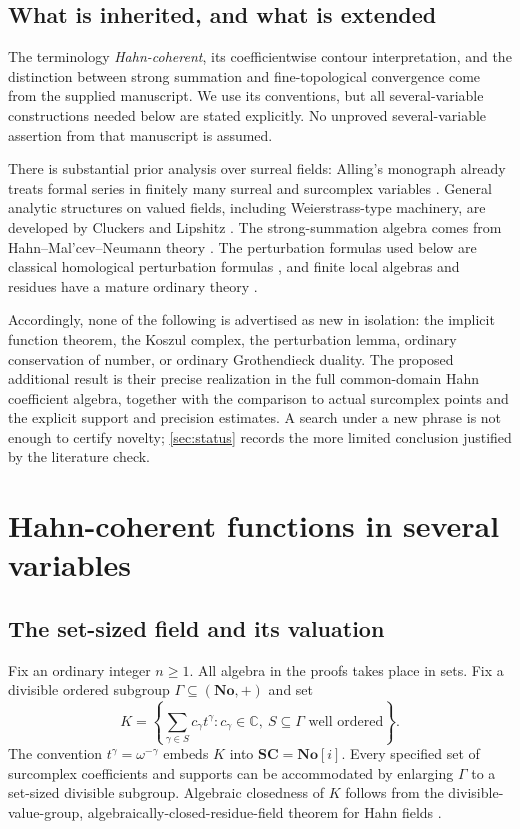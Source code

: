 \documentclass[11pt,letterpaper]{article}
\theoremstyle{definition}
\theoremstyle{remark}
\newcommand{\No}{\mathbf{No}}
\newcommand{\SC}{\mathbf{SC}}
\newcommand{\C}{\mathbb C}
\numberwithin{equation}{section}
\begin{document}
\subsection{What is inherited, and what is extended}
The terminology \emph{Hahn-coherent}, its coefficientwise contour interpretation, and the distinction between strong summation and fine-topological convergence come from the supplied manuscript. We use its conventions, but all several-variable constructions needed below are stated explicitly. No unproved several-variable assertion from that manuscript is assumed.

There is substantial prior analysis over surreal fields: Alling's monograph already treats formal series in finitely many surreal and surcomplex variables \cite{Alling}. General analytic structures on valued fields, including Weierstrass-type machinery, are developed by Cluckers and Lipshitz \cite{CluckersLipshitz}. The strong-summation algebra comes from Hahn--Mal'cev--Neumann theory \cite{Neumann,Poonen}. The perturbation formulas used below are classical homological perturbation formulas \cite{Crainic}, and finite local algebras and residues have a mature ordinary theory \cite{Demailly,Kunz,CattaniDickenstein}.

Accordingly, none of the following is advertised as new in isolation: the implicit function theorem, the Koszul complex, the perturbation lemma, ordinary conservation of number, or ordinary Grothendieck duality. The proposed additional result is their precise realization in the full common-domain Hahn coefficient algebra, together with the comparison to actual surcomplex points and the explicit support and precision estimates. A search under a new phrase is not enough to certify novelty; \cref{sec:status} records the more limited conclusion justified by the literature check.

\section{Hahn-coherent functions in several variables}\label{sec:hahn}

\subsection{The set-sized field and its valuation}
Fix an ordinary integer $n\ge1$. All algebra in the proofs takes place in sets. Fix a divisible ordered subgroup $\Gamma\subseteq(\No,+)$ and set
\[
 K=\left\{\sum_{\gamma\in S}c_\gamma t^\gamma:
 c_\gamma\in\C,\ S\subseteq\Gamma\text{ well ordered}\right\}.
\]
The convention $t^\gamma=\omega^{-\gamma}$ embeds $K$ into $\SC=\No[i]$. Every specified set of surcomplex coefficients and supports can be accommodated by enlarging $\Gamma$ to a set-sized divisible subgroup. Algebraic closedness of $K$ follows from the divisible-value-group, algebraically-closed-residue-field theorem for Hahn fields \cite[Corollary 4]{Poonen}.
\end{document}
